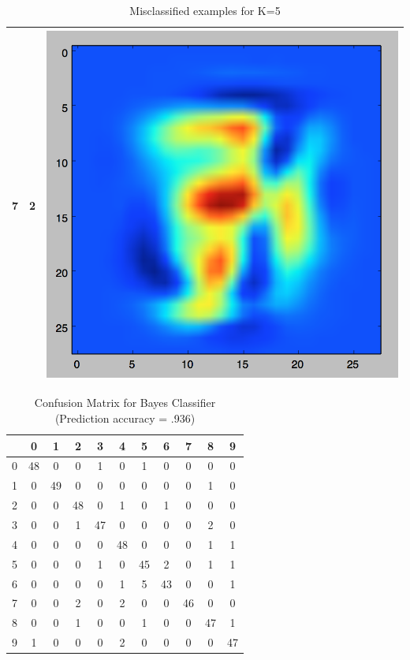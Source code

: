 \documentclass[11pt]{article}
\begin{document}
\begin{table}[!th]
\begin{tabular}{|c|c|c|}
\hline
7 & 2 & \includegraphics[scale=.15]{images/knn5_7_2.png} \\
\hline
\end{tabular}
\caption{Misclassified examples for K=5}
\label{ex:table}
\end{table}

\begin{table}[!th]
\centering
\begin{tabular}{|c|cccccccccc|}
\hline
 & 0 & 1 & 2 & 3 & 4 & 5 & 6 & 7 & 8 & 9 \\
\hline
0 & 48 & 0 & 0 & 1 & 0 & 1 & 0 & 0 & 0 & 0 \\
1 & 0 & 49 & 0 & 0 & 0 & 0 & 0 & 0 & 1 & 0 \\
2 & 0 & 0 & 48 & 0 & 1 & 0 & 1 & 0 & 0 & 0 \\
3 & 0 & 0 & 1 & 47 & 0 & 0 & 0 & 0 & 2 & 0 \\
4 & 0 & 0 & 0 & 0 & 48 & 0 & 0 & 0 & 1 & 1 \\ 
5 & 0 & 0 & 0 & 1 & 0 & 45 & 2 & 0 & 1 & 1 \\
6 & 0 & 0 & 0 & 0 & 1 & 5 & 43 & 0 & 0 & 1 \\ 
7 & 0 & 0 & 2 & 0 & 2 & 0 & 0 & 46 & 0 & 0 \\
8 & 0 & 0 & 1 & 0 & 0 & 1 & 0 & 0 & 47 & 1 \\
9 & 1 & 0 & 0 & 0 & 2 & 0 & 0 & 0 & 0 & 47 \\
\hline
\end{tabular}
\caption{Confusion Matrix for Bayes Classifier (Prediction accuracy = .936)}
\label{ex:table}
\end{table}
\end{document}
